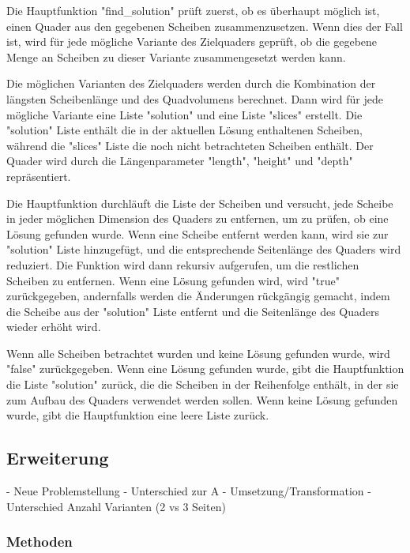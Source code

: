 \documentclass[a4paper,10pt,ngerman]{scrartcl}
\begin{document}
    Die Hauptfunktion "find\_solution" prüft zuerst, ob es überhaupt möglich ist, einen Quader aus den gegebenen Scheiben zusammenzusetzen.
    Wenn dies der Fall ist, wird für jede mögliche Variante des Zielquaders geprüft, ob die gegebene Menge an Scheiben zu dieser Variante zusammengesetzt werden kann.

    Die möglichen Varianten des Zielquaders werden durch die Kombination der längsten Scheibenlänge und des Quadvolumens berechnet.
    Dann wird für jede mögliche Variante eine Liste "solution" und eine Liste "slices" erstellt.
    Die "solution" Liste enthält die in der aktuellen Lösung enthaltenen Scheiben, während die "slices" Liste die noch nicht betrachteten Scheiben enthält.
    Der Quader wird durch die Längenparameter "length", "height" und "depth" repräsentiert.

    Die Hauptfunktion durchläuft die Liste der Scheiben und versucht, jede Scheibe in jeder möglichen Dimension des Quaders zu entfernen, um zu prüfen, ob eine Lösung gefunden wurde.
    Wenn eine Scheibe entfernt werden kann, wird sie zur "solution" Liste hinzugefügt, und die entsprechende Seitenlänge des Quaders wird reduziert.
    Die Funktion wird dann rekursiv aufgerufen, um die restlichen Scheiben zu entfernen.
    Wenn eine Lösung gefunden wird, wird "true" zurückgegeben, andernfalls werden die Änderungen rückgängig gemacht,
    indem die Scheibe aus der "solution" Liste entfernt und die Seitenlänge des Quaders wieder erhöht wird.

    Wenn alle Scheiben betrachtet wurden und keine Lösung gefunden wurde, wird "false" zurückgegeben.
    Wenn eine Lösung gefunden wurde, gibt die Hauptfunktion die Liste "solution" zurück, die die Scheiben in der Reihenfolge enthält, in der sie zum Aufbau des Quaders verwendet werden sollen.
    Wenn keine Lösung gefunden wurde, gibt die Hauptfunktion eine leere Liste zurück.

    \subsection{Erweiterung}\label{subsec:erweiterung2}

    - Neue Problemstellung
    - Unterschied zur A
    - Umsetzung/Transformation
    -Unterschied Anzahl Varianten (2 vs 3 Seiten)

    \subsubsection{Methoden}\label{subsubsec:methoden_erweiterung}
\end{document}
